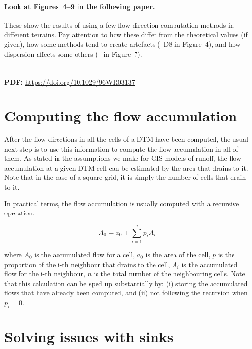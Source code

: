 \begin{link-box}
\paragraph{Look at Figures~4--9 in the following paper.} These show the results of using a few flow direction computation methods in different terrains.
Pay attention to how these differ from the theoretical values (if given), how some methods tend to create artefacts (\eg\ D8 in Figure~4), and how dispersion affects some others (\eg\ \citet{Quinn91} in Figure~7).
\\
\\
\\
\textbf{PDF:} \url{https://doi.org/10.1029/96WR03137}
\end{link-box}

\section{Computing the flow accumulation}%
\label{se:accumulation}

After the flow directions in all the cells of a DTM have been computed, the usual next step is to use this information to compute the flow accumulation in all of them.
As stated in the assumptions we make for GIS models of runoff, the flow accumulation at a given DTM cell can be estimated by the area that drains to it.
Note that in the case of a square grid, it is simply the number of cells that drain to it.

In practical terms, the flow accumulation is usually computed with a recursive operation:

\begin{equation}
A_0 = a_0 + \sum_{i=1}^{n} p_i A_i
\end{equation}

where \(A_0\) is the accumulated flow for a cell, \(a_0\) is the area of the cell, \(p\) is the proportion of the i-th neighbour that drains to the cell, \(A_i\) is the accumulated flow for the i-th neighbour, \(n\) is the total number of the neighbouring cells.
Note that this calculation can be sped up substantially by: (i) storing the accumulated flows that have already been computed, and (ii) not following the recursion when \(p_i = 0\).

\section{Solving issues with sinks}

